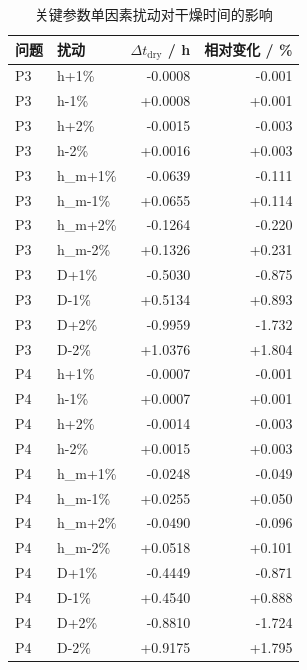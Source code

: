 \begin{table}[H]
\centering
\caption{关键参数单因素扰动对干燥时间的影响}
\label{tab:oat}
\footnotesize
\begin{tabular}{@{}llrr@{}}
\toprule
问题 & 扰动 & $\Delta t_{\mathrm{dry}}$ / h & 相对变化 / \% \\
\midrule
P3 & h+1\% & -0.0008 & -0.001 \\
P3 & h-1\% & +0.0008 & +0.001 \\
P3 & h+2\% & -0.0015 & -0.003 \\
P3 & h-2\% & +0.0016 & +0.003 \\
P3 & h\_m+1\% & -0.0639 & -0.111 \\
P3 & h\_m-1\% & +0.0655 & +0.114 \\
P3 & h\_m+2\% & -0.1264 & -0.220 \\
P3 & h\_m-2\% & +0.1326 & +0.231 \\
P3 & D+1\% & -0.5030 & -0.875 \\
P3 & D-1\% & +0.5134 & +0.893 \\
P3 & D+2\% & -0.9959 & -1.732 \\
P3 & D-2\% & +1.0376 & +1.804 \\
P4 & h+1\% & -0.0007 & -0.001 \\
P4 & h-1\% & +0.0007 & +0.001 \\
P4 & h+2\% & -0.0014 & -0.003 \\
P4 & h-2\% & +0.0015 & +0.003 \\
P4 & h\_m+1\% & -0.0248 & -0.049 \\
P4 & h\_m-1\% & +0.0255 & +0.050 \\
P4 & h\_m+2\% & -0.0490 & -0.096 \\
P4 & h\_m-2\% & +0.0518 & +0.101 \\
P4 & D+1\% & -0.4449 & -0.871 \\
P4 & D-1\% & +0.4540 & +0.888 \\
P4 & D+2\% & -0.8810 & -1.724 \\
P4 & D-2\% & +0.9175 & +1.795 \\
\bottomrule
\end{tabular}
\end{table}
